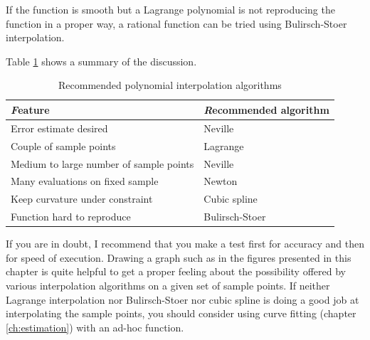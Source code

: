 If the function is smooth but a Lagrange polynomial is not
reproducing the function in a proper way, a rational function can
be tried using Bulirsch-Stoer interpolation.

Table \ref{tb:interpol} shows a summary of the discussion.
\begin{table}[h]
  \centering
  \caption{Recommended polynomial interpolation algorithms}\label{tb:interpol}
  \vspace{1 ex}
\begin{tabular}{|l|l|} \hline
  {\textsl Feature} & {\textsl Recommended algorithm} \\ \hline
  Error estimate desired&Neville\\ \hline
  Couple of sample points&Lagrange \\ \hline
  Medium to large number of sample points&Neville \\ \hline
  Many evaluations on fixed sample&Newton\\ \hline
  Keep curvature under constraint&Cubic spline\\ \hline
  Function hard to reproduce&Bulirsch-Stoer\\ \hline
\end{tabular}
\end{table}
If you are in doubt, I recommend that you make a test first for
accuracy and then for speed of execution. Drawing a graph such as
in the figures presented in this chapter is quite helpful to get a
proper feeling about the possibility offered by various
interpolation algorithms on a given set of sample points. If
neither Lagrange interpolation nor Bulirsch-Stoer nor cubic spline
is doing a good job at interpolating the sample points, you should
consider using curve fitting (\cf chapter \ref{ch:estimation})
with an ad-hoc function.

